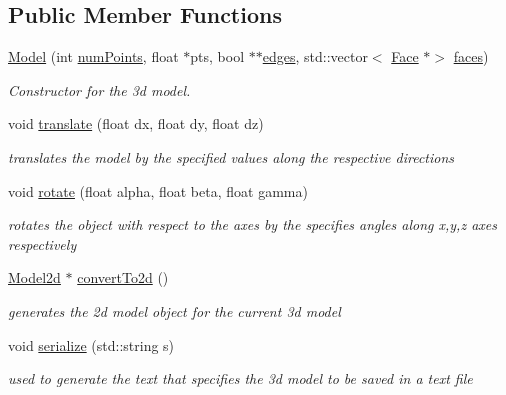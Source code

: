 \subsection*{Public Member Functions}
\begin{DoxyCompactItemize}
\item 
\mbox{\hyperlink{class_model_a39cf79e51da0f52f1031f98f1bebd118}{Model}} (int \mbox{\hyperlink{class_model_a39ac6e91375d5ac5799a9845c3479d9c}{num\+Points}}, float $\ast$pts, bool $\ast$$\ast$\mbox{\hyperlink{class_model_a723a0c631c2ff688fed06c5652879ef7}{edges}}, std\+::vector$<$ \mbox{\hyperlink{class_face}{Face}} $\ast$$>$ \mbox{\hyperlink{class_model_a7752ae8e1bbacc53ed94d7bd9c404b6d}{faces}})
\begin{DoxyCompactList}\small\item\em Constructor for the 3d model. \end{DoxyCompactList}\item 
void \mbox{\hyperlink{class_model_a32e61c8487a2202e9f3f041a8abcb3c2}{translate}} (float dx, float dy, float dz)
\begin{DoxyCompactList}\small\item\em translates the model by the specified values along the respective directions \end{DoxyCompactList}\item 
void \mbox{\hyperlink{class_model_ae5999fb77646320aed8d81a669568caa}{rotate}} (float alpha, float beta, float gamma)
\begin{DoxyCompactList}\small\item\em rotates the object with respect to the axes by the specifies angles along x,y,z axes respectively \end{DoxyCompactList}\item 
\mbox{\hyperlink{class_model2d}{Model2d}} $\ast$ \mbox{\hyperlink{class_model_ac62fb1874a6597955c89fe3a9a1663e1}{convert\+To2d}} ()
\begin{DoxyCompactList}\small\item\em generates the 2d model object for the current 3d model \end{DoxyCompactList}\item 
void \mbox{\hyperlink{class_model_abc71b3488f7f944f1c99727a491ee985}{serialize}} (std\+::string s)
\begin{DoxyCompactList}\small\item\em used to generate the text that specifies the 3d model to be saved in a text file \end{DoxyCompactList}\end{DoxyCompactItemize}
